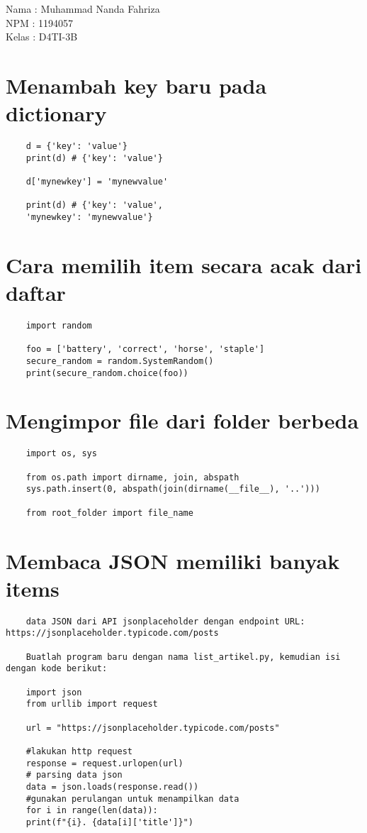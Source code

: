 \documentclass{article}
\begin{document}
Nama	: Muhammad Nanda Fahriza \\
NPM		: 1194057 \\
Kelas	: D4TI-3B \\

\section{Menambah key baru pada dictionary}
\begin{lstlisting}
	d = {'key': 'value'}
	print(d) # {'key': 'value'}
	
	d['mynewkey'] = 'mynewvalue'
	
	print(d) # {'key': 'value',
	'mynewkey': 'mynewvalue'}
\end{lstlisting}

\section{Cara memilih item secara acak dari daftar}
\begin{lstlisting}
	import random
		
	foo = ['battery', 'correct', 'horse', 'staple']
	secure_random = random.SystemRandom()
	print(secure_random.choice(foo))
\end{lstlisting}

\section{Mengimpor file dari folder berbeda}
\begin{lstlisting}
	import os, sys
		
	from os.path import dirname, join, abspath
	sys.path.insert(0, abspath(join(dirname(__file__), '..')))
	
	from root_folder import file_name
\end{lstlisting}

\section{Membaca JSON memiliki banyak items}
\begin{lstlisting}
	data JSON dari API jsonplaceholder dengan endpoint URL: https://jsonplaceholder.typicode.com/posts
	
	Buatlah program baru dengan nama list_artikel.py, kemudian isi dengan kode berikut:
	
	import json
	from urllib import request
	
	url = "https://jsonplaceholder.typicode.com/posts"
	
	#lakukan http request
	response = request.urlopen(url)
	# parsing data json
	data = json.loads(response.read())
	#gunakan perulangan untuk menampilkan data
	for i in range(len(data)):
	print(f"{i}. {data[i]['title']}")
\end{lstlisting}
\end{document}
